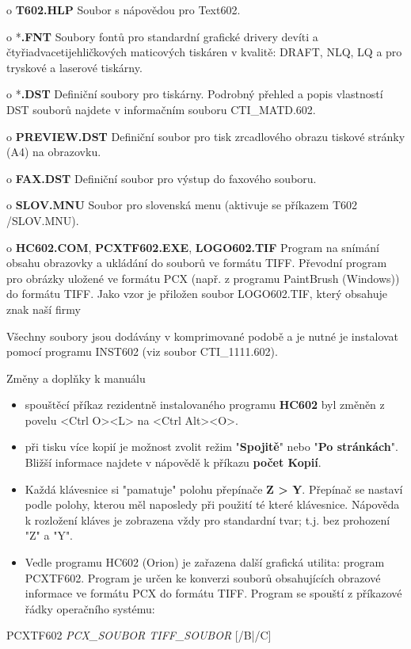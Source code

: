 \documentclass[11pt,a4paper]{article}
\begin{document}
o \textbf{T602.HLP} Soubor s nápovědou pro Text602.

o *\textbf{.FNT} Soubory fontů pro standardní grafické drivery devíti a čtyřiadvacetijehličkových maticových tiskáren v kvalitě: DRAFT, NLQ, LQ a pro tryskové a laserové tiskárny.

o *\textbf{.DST} Definiční soubory pro tiskárny. Podrobný přehled a popis vlastností DST souborů najdete v informačním souboru CTI\_MATD.602.

o \textbf{PREVIEW.DST} Definiční soubor pro tisk zrcadlového obrazu tiskové stránky (A4) na obrazovku.

o \textbf{FAX.DST} Definiční soubor pro výstup do faxového souboru.

o \textbf{SLOV.MNU} Soubor pro slovenská menu (aktivuje se příkazem T602 /SLOV.MNU).

o \textbf{HC602.COM}, \textbf{PCXTF602.EXE}, \textbf{LOGO602.TIF} Program na snímání obsahu obrazovky a ukládání do souborů ve formátu TIFF. Převodní program pro obrázky uložené ve formátu PCX (např. z programu PaintBrush (Windows)) do formátu TIFF. Jako vzor je přiložen soubor LOGO602.TIF, který obsahuje znak naší firmy

Všechny soubory jsou dodávány v komprimované podobě a je nutné je instalovat pomocí programu INST602 (viz soubor CTI\_1111.602).

Změny a doplňky k manuálu

\begin{itemize}
\item spouštěcí příkaz rezidentně instalovaného programu \textbf{HC602} byl změněn z povelu <Ctrl O><L> na <Ctrl Alt><O>.
\item při tisku více kopií je možnost zvolit režim "\textbf{Spojitě}" nebo "\textbf{Po stránkách}". Bližší informace najdete v nápovědě k příkazu \textbf{počet Kopií}.
\item Každá klávesnice si "pamatuje" polohu přepínače \textbf{Z > Y}. Přepínač se nastaví podle polohy, kterou měl naposledy při použití té které klávesnice. Nápověda k rozložení kláves je zobrazena vždy pro standardní tvar; t.j. bez prohození "Z" a "Y".
\item Vedle programu HC602 (Orion) je zařazena další grafická utilita: program PCXTF602. Program je určen ke konverzi souborů obsahujících obrazové informace ve formátu PCX do formátu TIFF. Program se spouští z příkazové řádky operačního systému:
\end{itemize}

PCXTF602 \textit{PCX\_SOUBOR TIFF\_SOUBOR} [/B|/C]
\end{document}
